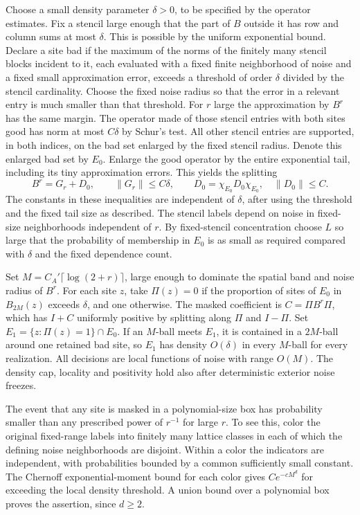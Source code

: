 \documentclass[11pt]{article}
\begin{document}
Choose a small density parameter \(\delta>0\), to be specified by the operator estimates. Fix a stencil large enough that the part of \(B\) outside it has row and column sums at most \(\delta\). This is possible by the uniform exponential bound. Declare a site bad if the maximum of the norms of the finitely many stencil blocks incident to it, each evaluated with a fixed finite neighborhood of noise and a fixed small approximation error, exceeds a threshold of order \(\delta\) divided by the stencil cardinality. Choose the fixed noise radius so that the error in a relevant entry is much smaller than that threshold. For \(r\) large the approximation by \(B^r\) has the same margin. The operator made of those stencil entries with both sites good has norm at most \(C\delta\) by Schur's test. All other stencil entries are supported, in both indices, on the bad set enlarged by the fixed stencil radius. Denote this enlarged bad set by \(E_0\). Enlarge the good operator by the entire exponential tail, including its tiny approximation errors. This yields the splitting \[
B^r=G_r+D_0,\qquad \|G_r\|\le C\delta,\qquad D_0=\chi_{E_0}D_0\chi_{E_0},\quad \|D_0\|\le C.
\] The constants in these inequalities are independent of \(\delta\), after using the threshold and the fixed tail size as described. The stencil labels depend on noise in fixed-size neighborhoods independent of \(r\). By fixed-stencil concentration choose \(L\) so large that the probability of membership in \(E_0\) is as small as required compared with \(\delta\) and the fixed dependence count.

Set \(M=C_A'\lceil\log(2+r)\rceil\), large enough to dominate the spatial band and noise radius of \(B^r\). For each site \(z\), take \(\Pi(z)=0\) if the proportion of sites of \(E_0\) in \(B_{2M}(z)\) exceeds \(\delta\), and one otherwise. The masked coefficient is \(C=\Pi B^r\Pi\), which has \(I+C\) uniformly positive by splitting along \(\Pi\) and \(I-\Pi\). Set \(E_1=\{z:\Pi(z)=1\}\cap E_0\). If an \(M\)-ball meets \(E_1\), it is contained in a \(2M\)-ball around one retained bad site, so \(E_1\) has density \(O(\delta)\) in every \(M\)-ball for every realization. All decisions are local functions of noise with range \(O(M)\). The density cap, locality and positivity hold also after deterministic exterior noise freezes.

The event that any site is masked in a polynomial-size box has probability smaller than any prescribed power of \(r^{-1}\) for large \(r\). To see this, color the original fixed-range labels into finitely many lattice classes in each of which the defining noise neighborhoods are disjoint. Within a color the indicators are independent, with probabilities bounded by a common sufficiently small constant. The Chernoff exponential-moment bound for each color gives \(C e^{-c M^d}\) for exceeding the local density threshold. A union bound over a polynomial box proves the assertion, since \(d\ge2\).
\end{document}
